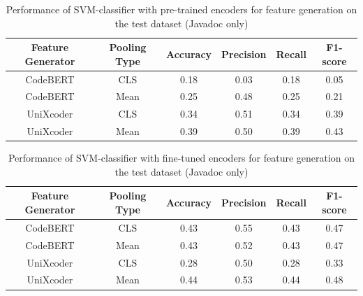     \begin{table}[H]
        \caption{Performance of SVM-classifier with pre-trained encoders for feature generation on the test dataset (Javadoc only)}
        \label{tab:test_perfomance_pre_svm_javadoc}
        \begin{center}
            \begin{tabular}{c|c|c|c|c|c}
                \textbf{Feature Generator} & \textbf{Pooling Type} & \textbf{Accuracy} & \textbf{Precision} & \textbf{Recall} & \textbf{F1-score}  \\
                \hline
                CodeBERT & CLS & 0.18 & 0.03 & 0.18 & 0.05 \\
                CodeBERT & Mean & 0.25 & 0.48 & 0.25  & 0.21 \\
                UniXcoder & CLS & 0.34 & 0.51 & 0.34 & 0.39 \\
                UniXcoder & Mean & 0.39 & 0.50 & 0.39 & 0.43 \\
            \end{tabular}
        \end{center}
    \end{table}
    
    
    \begin{table}[H]
        \caption{Performance of SVM-classifier with fine-tuned encoders for feature generation on the test dataset (Javadoc only)}
        \label{tab:test_perfomance_fine_svm_javadoc}
        \begin{center}
            \begin{tabular}{c|c|c|c|c|c}
                \textbf{Feature Generator} & \textbf{Pooling Type} & \textbf{Accuracy} & \textbf{Precision} & \textbf{Recall} & \textbf{F1-score}  \\
                \hline
                CodeBERT & CLS & 0.43 & 0.55 & 0.43 & 0.47 \\
                CodeBERT & Mean & 0.43 & 0.52 & 0.43 & 0.47 \\
                UniXcoder & CLS & 0.28 & 0.50 & 0.28 & 0.33 \\
                UniXcoder & Mean & 0.44 & 0.53 & 0.44 & 0.48 \\
            \end{tabular}
        \end{center}
    \end{table}
    
